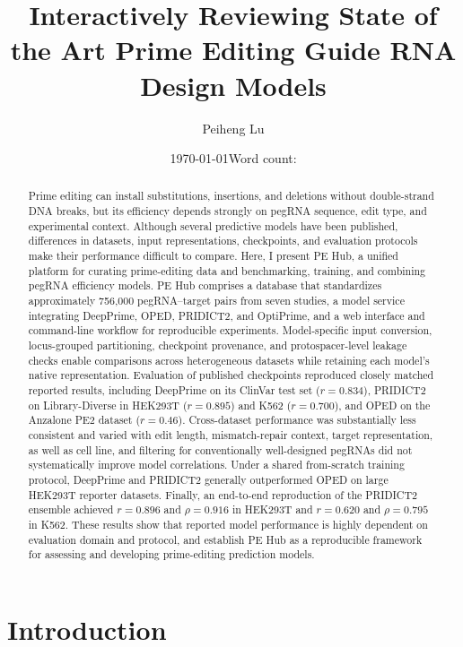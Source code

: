 \documentclass{article}
\title{Interactively Reviewing State of the Art Prime Editing Guide RNA Design Models}
\author{Peiheng Lu}
\date{\today\qquad Word count: \wordcountwords}
\begin{document}
\maketitle

\begin{abstract}

Prime editing can install substitutions, insertions, and deletions without double-strand DNA breaks, but its efficiency depends strongly on pegRNA sequence, edit type, and experimental context. Although several predictive models have been published, differences in datasets, input representations, checkpoints, and evaluation protocols make their performance difficult to compare. Here, I present PE Hub, a unified platform for curating prime-editing data and benchmarking, training, and combining pegRNA efficiency models. PE Hub comprises a database that standardizes approximately 756,000 pegRNA--target pairs from seven studies, a model service integrating DeepPrime, OPED, PRIDICT2, and OptiPrime, and a web interface and command-line workflow for reproducible experiments. Model-specific input conversion, locus-grouped partitioning, checkpoint provenance, and protospacer-level leakage checks enable comparisons across heterogeneous datasets while retaining each model's native representation. Evaluation of published checkpoints reproduced closely matched reported results, including DeepPrime on its ClinVar test set ($r=0.834$), PRIDICT2 on Library-Diverse in HEK293T ($r=0.895$) and K562 ($r=0.700$), and OPED on the Anzalone PE2 dataset ($r=0.46$). Cross-dataset performance was substantially less consistent and varied with edit length, mismatch-repair context, target representation, as well as cell line, and filtering for conventionally well-designed pegRNAs did not systematically improve model correlations. Under a shared from-scratch training protocol, DeepPrime and PRIDICT2 generally outperformed OPED on large HEK293T reporter datasets. Finally, an end-to-end reproduction of the PRIDICT2 ensemble achieved $r=0.896$ and $\rho=0.916$ in HEK293T and $r=0.620$ and $\rho=0.795$ in K562. These results show that reported model performance is highly dependent on evaluation domain and protocol, and establish PE Hub as a reproducible framework for assessing and developing prime-editing prediction models.

\end{abstract}

\section{Introduction}
\end{document}
